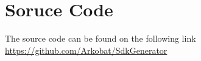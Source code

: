 \section{Soruce Code \label{appendix:source_code}}
The source code can be found on the following link
\href{https://github.com/Arkobat/SdkGenerator}{https://github.com/Arkobat/SdkGenerator}